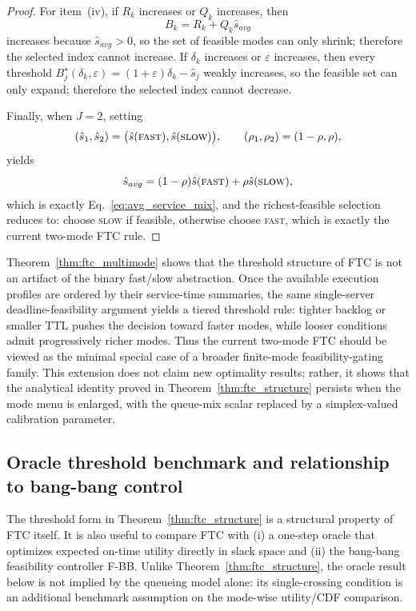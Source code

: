 \documentclass[fleqn,12pt,lineno]{wlpeerj}
\begin{document}
\begin{proof}
For item~(iv), if $R_k$ increases or $Q_k$ increases, then
\[
B_k = R_k + Q_k \hat{s}_{avg}
\]
increases because $\hat{s}_{avg} > 0$, so the set of feasible modes can
only shrink; therefore the selected index cannot increase. If $\delta_k$
increases or $\varepsilon$ increases, then every threshold
$B_j^\star(\delta_k,\varepsilon)=(1+\varepsilon)\delta_k-\hat{s}_j$ weakly
increases, so the feasible set can only expand; therefore the selected index
cannot decrease.

Finally, when $J=2$, setting
\[
(\hat{s}_1,\hat{s}_2)=\bigl(\hat{s}(\textsc{fast}),\hat{s}(\textsc{slow})\bigr), \qquad
(\rho_1,\rho_2)=(1-\rho,\rho),
\]
yields
\[
\hat{s}_{avg}
=
(1-\rho)\hat{s}(\textsc{fast})+\rho \hat{s}(\textsc{slow}),
\]
which is exactly Eq.~\eqref{eq:avg_service_mix}, and the richest-feasible selection reduces to:
choose \textsc{slow} if feasible, otherwise choose \textsc{fast}, which is exactly the current
two-mode FTC rule.
\end{proof}

Theorem~\ref{thm:ftc_multimode} shows that the threshold structure of FTC is not an artifact of the binary fast/slow abstraction. Once the available execution profiles are ordered by their service-time summaries, the same single-server deadline-feasibility argument yields a tiered threshold rule: tighter backlog or smaller TTL pushes the decision toward faster modes, while looser conditions admit progressively richer modes. Thus the current two-mode FTC should be viewed as the minimal special case of a broader finite-mode feasibility-gating family. This extension does not claim new optimality results; rather, it shows that the analytical identity proved in Theorem~\ref{thm:ftc_structure} persists when the mode menu is enlarged, with the queue-mix scalar replaced by a simplex-valued calibration parameter.

\subsection{Oracle threshold benchmark and relationship to bang-bang control}
\label{sec:oracle_fbb}

The threshold form in Theorem~\ref{thm:ftc_structure} is a structural property of FTC itself. It is also useful to compare FTC with (i) a one-step oracle that optimizes expected on-time utility directly in slack space and (ii) the bang-bang feasibility controller F-BB. Unlike Theorem~\ref{thm:ftc_structure}, the oracle result below is not implied by the queueing model alone: its single-crossing condition is an additional benchmark assumption on the mode-wise utility/CDF comparison.
\end{document}
